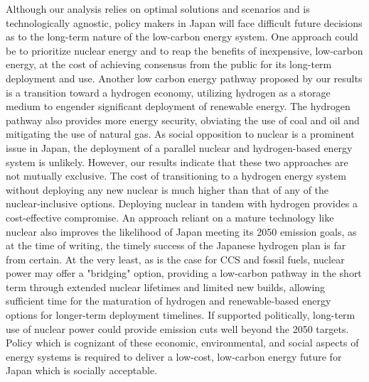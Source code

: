 Although our analysis relies on optimal solutions and scenarios and is technologically agnostic, policy makers in Japan will face difficult future decisions as to the long-term nature of the low-carbon energy system. One approach could be to prioritize nuclear energy and to reap the benefits of inexpensive, low-carbon energy, at the cost of achieving consensus from the public for its long-term deployment and use. Another low carbon energy pathway proposed by our results is a transition toward a hydrogen economy, utilizing hydrogen as a storage medium to engender significant deployment of renewable energy. The hydrogen pathway also provides more energy security, obviating the use of coal and oil and mitigating the use of natural gas. As social opposition to nuclear is a prominent issue in Japan, the deployment of a parallel nuclear and hydrogen-based energy system is unlikely. However, our results indicate that these two approaches are not mutually exclusive. The cost of transitioning to a hydrogen energy system without deploying any new nuclear is much higher than that of any of the nuclear-inclusive options. Deploying nuclear in tandem with hydrogen provides a cost-effective compromise. An approach reliant on a mature technology like nuclear also improves the likelihood of Japan meeting its 2050 emission goals, as at the time of writing, the timely success of the Japanese hydrogen plan is far from certain. At the very least, as is the case for CCS and fossil fuels, nuclear power may offer a "bridging" option, providing a low-carbon pathway in the short term through extended nuclear lifetimes and limited new builds, allowing sufficient time for the maturation of hydrogen and renewable-based energy options for longer-term deployment timelines. If supported politically, long-term use of nuclear power could provide emission cuts well beyond the 2050 targets. Policy which is cognizant of these economic, environmental, and social aspects of energy systems is required to deliver a low-cost, low-carbon energy future for Japan which is socially acceptable.
